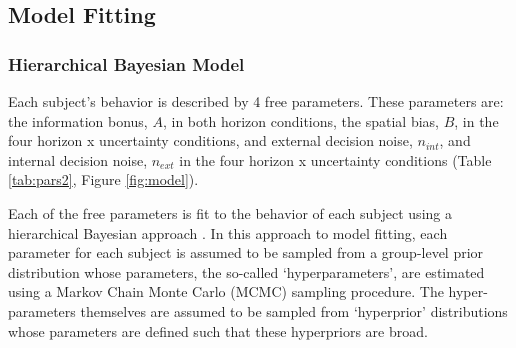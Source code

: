 \documentclass[12pt]{article}
\begin{document}
	
	\subsection*{Model Fitting}
	\subsubsection*{Hierarchical Bayesian Model}
	Each subject's behavior is described by 4 free parameters. These parameters are: the information bonus, $A$, in both horizon conditions, the spatial bias, $B$, in the four horizon x uncertainty conditions, and external decision noise, $n_{int}$, and internal decision noise, $n_{ext}$ in the four horizon x uncertainty conditions (Table \ref{tab:pars2}, Figure \ref{fig:model}). 
	
	Each of the free parameters is fit to the behavior of each subject using a hierarchical Bayesian approach \cite{}.  In this approach to model fitting, each parameter for each subject is assumed to be sampled from a group-level prior distribution whose parameters, the so-called `hyperparameters', are estimated using a Markov Chain Monte Carlo (MCMC) sampling procedure. The hyper-parameters themselves are assumed to be sampled from `hyperprior' distributions whose parameters are defined such that these hyperpriors are broad.  
	
\end{document}
